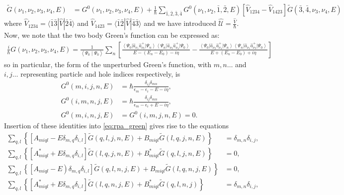 \begin{align}
    \tilde{G}\left(\nu_1, \nu_2, \nu_3, \nu_4, E\right) &= G^0\left(\nu_1, \nu_2, \nu_3, \nu_4, E\right) + \frac{1}{\hbar} \sum_{\bar{1}, \bar{2}, \bar{3}, \bar{4}} G^0\left(\nu_1, \nu_2, \bar{1}, \bar{2}, E\right) \left[ \hat{V}_{1234} - \hat{V}_{1423} \right] \tilde{G}\left(\bar{3}, \bar{4}, \nu_3, \nu_4, E\right)
\label{eq:rpa_green}
\end{align}
where  $\hat{V}_{1234} = \langle \bar{1} \bar{3} | \hat{V} | \bar{2} \bar{4} \rangle$ and $\hat{V}_{1423} = \langle \bar{1} \bar{2} | \hat{V} | \bar{4} \bar{3} \rangle$ and we have introduced $\hat{\mathcal{U}} = \frac{\hat{V}}{\hbar}$.
Now, we note that the two body Green's function can be expressed as:
\begin{align}
    \frac{i}{\hbar} {G}\left(\nu_1, \nu_2, \nu_3, \nu_4, E\right)=\frac{1}{\left\langle\Psi_0 \mid \Psi_0\right\rangle} \sum_n\left[\frac{\left\langle\Psi_0\right| \hat{a}_{\nu_1} \hat{a}_{\nu_3}^{+}\left|\Psi_n\right\rangle\left\langle\Psi_n\right| \hat{a}_{\nu_2} \hat{a}_{\nu_4}^{+}\left|\Psi_0\right\rangle}{E-\left(E_n-E_0\right)-i \eta}-\frac{\left\langle\Psi_0\right| \hat{a}_{\nu_2} \hat{a}_{\nu_4}^{+}\left|\Psi_n\right\rangle\left\langle\Psi_n\right| \hat{a}_{\nu_1} \hat{a}_{\nu_3}^{+}\left|\Psi_0\right\rangle}{E+\left(E_n-E_0\right)+i \eta}\right]
\end{align}
so in particular, the form of the unperturbed Green's function, with $m,n
\ldots$ and $i,j\ldots$ representing particle and hole indices respectively, is
\begin{align}
G^0(m, i, j, n, E) &= \hbar \frac{\delta_{i j} \delta_{m n}}{\epsilon_m-\epsilon_i-E-i \eta}, \\
G^0(i, m, n, j, E) &= \hbar \frac{\delta_{i j} \delta_{m n}}{\epsilon_m-\epsilon_i+E-i \eta}, \\
G^0(m, i, n, j, E) &= G^0(i, m, j, n, E) = 0.
\end{align}
Insertion of these identities into \ref{eq:rpa_green} gives rise to the equations
\begin{align}
    \sum_{q, l}\left\{\left[A_{m i q l}-E \delta_{m, q} \delta_{i, l}\right] \tilde{G}(q, l, j, n, E)+B_{m i q l} \tilde{G}(l, q, j, n, E)\right\} &= \delta_{m, n} \delta_{i, j}, \\
    \sum_{q, l}\left\{\left[A_{m i q l}^*+E \delta_{m, q} \delta_{i, l}\right] \tilde{G}(l, q, j, n, E)+B_{m i q l}^* \tilde{G}(q, l, j, n, E)\right\} &= 0, \\
    \left.\sum_{q, l}\left\{\left[A_{m i q l}-E\right) \delta_{m, q} \delta_{i, l}\right] \tilde{G}(q, l, n, j, E)+B_{m i q l} \tilde{G}(l, q, n, j, E)\right\} &= 0, \\
    \sum_{q, l}\left\{\left[A_{m i q l}^*+E \delta_{m, q} \delta_{i, l}\right] \tilde{G}(l, q, n, j, E)+B_{m i q l}^* \tilde{G}(q, l, n, j)\right\} &= \delta_{m, n} \delta_{i, j},
\end{align}
